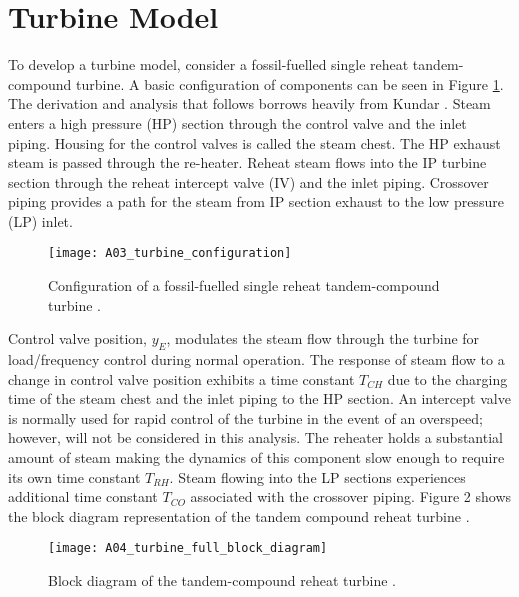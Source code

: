 \section{Turbine Model}\label{app:turbine_model}
To develop a turbine model, consider a fossil-fuelled single reheat tandem-compound turbine. A basic configuration of components can be seen in Figure \ref{fig:A03_turbine_configuration}. The derivation and analysis that follows borrows heavily from Kundar \cite{Kundur1994}. Steam enters a high pressure (HP) section through the control valve and the inlet piping. Housing for the control valves is called the steam chest. The HP exhaust steam is passed through the re-heater. Reheat steam flows into the IP turbine section through the reheat intercept valve (IV) and the inlet piping. Crossover piping provides a path for the steam from IP section exhaust to the low pressure (LP) inlet.

\begin{figure}[h]
	\centering
	\texttt{[image: A03\_turbine\_configuration]}
	\caption[Reheat tandem-compound turbine configuration]{Configuration of a fossil-fuelled single reheat tandem-compound turbine \cite{Kundur1994}.}
	\label{fig:A03_turbine_configuration}
\end{figure}

Control valve position, $y_E$, modulates the steam flow through the turbine for load/frequency control during normal operation. The response of steam flow to a change in control valve position exhibits a time constant $T_{CH}$ due to the charging time of the steam chest and the inlet piping to the HP section. An intercept valve is normally used for rapid control of the turbine in the event of an overspeed; however, will not be considered in this analysis. The reheater holds a substantial amount of steam making the dynamics of this component slow enough to require its own time constant $T_{RH}$. Steam flowing into the LP sections experiences additional time constant $T_{CO}$ associated with the crossover piping. Figure 2 shows the block diagram representation of the tandem compound reheat turbine \cite{Kundur1994}.

\begin{figure}[h]
	\centering
	\texttt{[image: A04\_turbine\_full\_block\_diagram]}
	\caption[Tandem-compound reheat turbine model]{Block diagram of the tandem-compound reheat turbine \cite{Kundur1994}.}
	\label{fig:A04_turbine_full_block_diagram}
\end{figure}

